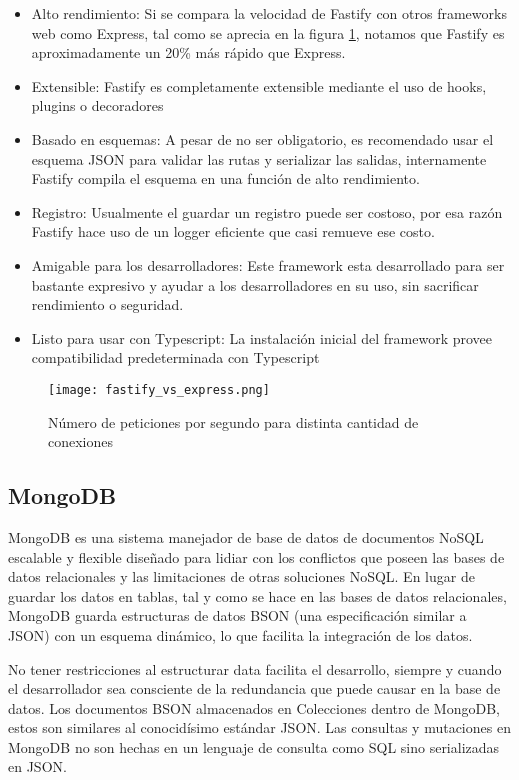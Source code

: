 \begin{itemize}
    \item Alto rendimiento: Si se compara la velocidad de Fastify con otros frameworks web como Express, tal como se aprecia en la figura \ref{fig:fastify_vs_express}, notamos que Fastify es aproximadamente un 20\% más rápido que Express.
    \item Extensible: Fastify es completamente extensible mediante el uso de hooks, plugins o decoradores
    \item Basado en esquemas: A pesar de no ser obligatorio, es recomendado usar el esquema JSON para validar las rutas y serializar las salidas, internamente Fastify compila el esquema en una función de alto rendimiento.
    \item Registro: Usualmente el guardar un registro puede ser costoso, por esa razón Fastify hace uso de un logger eficiente que casi remueve ese costo.
    \item Amigable para los desarrolladores: Este framework esta desarrollado para ser bastante expresivo y ayudar a los desarrolladores en su uso, sin sacrificar rendimiento o seguridad.
    \item Listo para usar con Typescript: La instalación inicial del framework provee compatibilidad predeterminada con Typescript
\end{itemize}


\begin{figure}[H]
    \texttt{[image: fastify\_vs\_express.png]}
    \caption{ Número de peticiones por segundo para distinta cantidad de conexiones}
    \label{fig:fastify_vs_express}
\end{figure}

\subsection{MongoDB}

MongoDB es una sistema manejador de base de datos de documentos NoSQL escalable y flexible diseñado para lidiar con los conflictos que poseen las bases de datos relacionales y las limitaciones de otras soluciones NoSQL. En lugar de guardar los datos en tablas, tal y como se hace en las bases de datos relacionales, MongoDB guarda estructuras de datos BSON (una especificación similar a JSON) con un esquema dinámico, lo que facilita la integración de los datos.

No tener restricciones al estructurar data facilita el desarrollo, siempre y cuando el desarrollador sea consciente de la redundancia que puede causar en la base de datos. Los documentos BSON almacenados en Colecciones dentro de MongoDB, estos son similares al conocidísimo estándar JSON. Las consultas y mutaciones en MongoDB no son hechas en un lenguaje de consulta como SQL sino serializadas en JSON.   

